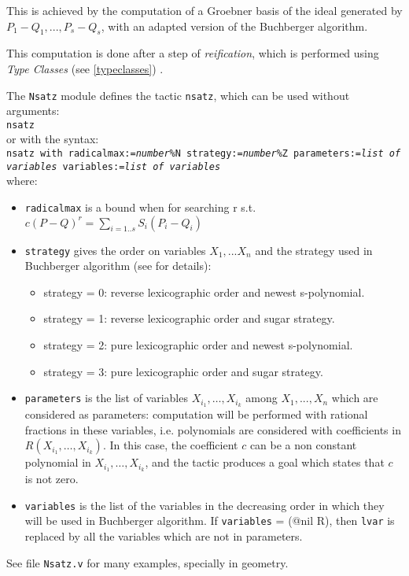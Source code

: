 This is achieved by the computation of a Groebner basis of the
ideal generated by $P_1-Q_1,...,P_s-Q_s$, with an adapted version of the Buchberger
algorithm.

This computation is done after a step of {\em reification}, which is
performed using {\em Type Classes}
(see \ref{typeclasses})
.

The \texttt{Nsatz} module defines the tactic
\texttt{nsatz}, which can be used without arguments: \\
\vspace*{3mm}
\texttt{nsatz}\\
or with the syntax: \\
\vspace*{3mm}
\texttt{nsatz with radicalmax:={\em number}\%N strategy:={\em number}\%Z parameters:={\em list of variables} variables:={\em list of variables}}\\
where:

\begin{itemize}
    \item \texttt{radicalmax} is a bound when for searching r s.t.$c (P-Q)^r =
\sum_{i=1..s} S_i (P_i - Q_i)$

    \item \texttt{strategy} gives the order on variables $X_1,...X_n$ and
the strategy used in Buchberger algorithm (see
\cite{sugar} for details):

        \begin{itemize}
                \item  strategy = 0: reverse lexicographic order and newest s-polynomial.
                \item   strategy = 1: reverse lexicographic order and sugar strategy.
                \item  strategy = 2: pure lexicographic order and newest s-polynomial.
                \item   strategy = 3: pure lexicographic order and sugar strategy.
        \end{itemize}

        \item \texttt{parameters} is the list of variables
$X_{i_1},\ldots,X_{i_k}$  among $X_1,...,X_n$ which are considered as
   parameters: computation will be performed with rational fractions in these
   variables, i.e. polynomials are considered with coefficients in
$R(X_{i_1},\ldots,X_{i_k})$. In this case, the coefficient $c$ can be a non
constant polynomial in $X_{i_1},\ldots,X_{i_k}$, and the tactic produces a goal
which states that $c$ is not zero.

        \item \texttt{variables} is the list of the variables
in the decreasing order in which they will be used in Buchberger algorithm. If \texttt{variables} = {(@nil
R)}, then \texttt{lvar} is replaced by all the variables which are not in
parameters.

\end{itemize}

See file \texttt{Nsatz.v} for many examples, specially in geometry.

